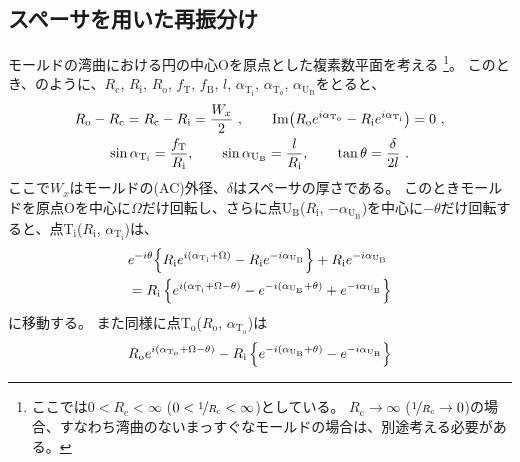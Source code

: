 \subsection{スペーサを用いた再振分け}
モールドの湾曲における円の中心Oを原点とした複素数平面を考える
\footnote{ここでは$0 < R_\mathrm c < \infty$ ($0 < \nicefrac1{R_\mathrm c} < \infty$)としている。
$R_\mathrm c \to \infty$ ($\nicefrac1{R_\mathrm c} \to 0$)の場合、すなわち湾曲のないまっすぐなモールドの場合は、別途考える必要がある。}。
このとき、のように、$R_\mathrm c$, $R_\mathrm i$, $R_\mathrm o$, $f_\mathrm T$, $f_\mathrm B$, $l$, $\alpha_{\mathrm T_\mathrm i}$, $\alpha_{\mathrm T_\mathrm o}$, $\alpha_{\mathrm U_\mathrm B}$をとると、
\begin{subequations}
\begin{gather}
  \label{eq:constraintUpoint1}
  R_\mathrm o - R_\mathrm c = R_\mathrm c - R_\mathrm i = \frac{W_x}2~, \qquad
  \operatorname{Im}\!\left(R_\mathrm oe^{i\alpha_{\mathrm T_\mathrm o}} - R_\mathrm ie^{i\alpha_{\mathrm T_\mathrm i}}\right)
  = 0~,\\
  \label{eq:constraintUpoint2}
  \sin\alpha_{\mathrm T_\mathrm i} = \frac{f_\mathrm T}{R_\mathrm i}, \qquad
  \sin\alpha_{\mathrm U_\mathrm B} = \frac l{R_\mathrm i}, \qquad
  \tan\theta = \frac\delta{2l}~.
\end{gather}
\end{subequations}
ここで$W_x$はモールドの(AC)外径、$\delta$はスペーサの厚さである。
このときモールドを原点Oを中心に$\Omega$だけ回転し、さらに点U$_\mathrm B$($R_\mathrm i$, $-\alpha_{\mathrm U_\mathrm B}$)を中心に$-\theta$だけ回転すると、点T$_\mathrm i$($R_\mathrm i$, $\alpha_{\mathrm T_\mathrm i}$)は、
\begin{align}
  \notag
  & e^{-i\theta}\!\left\{R_\mathrm ie^{i(\alpha_{\mathrm T_\mathrm i} + \Omega)} - R_\mathrm ie^{-i\alpha_{\mathrm U_\mathrm B}}\right\}
    +R_\mathrm ie^{-i\alpha_{\mathrm U_\mathrm B}}\\
  &= R_\mathrm i
     \left\{
       e^{i(\alpha_{\mathrm T_\mathrm i} + \Omega - \theta)} - e^{-i(\alpha_{\mathrm U_\mathrm B} + \theta)} + e^{-i\alpha_{\mathrm U_\mathrm B}}
     \right\}
  \label{eq:afterftUpoint}
\end{align}
に移動する。
また同様に点T$_\mathrm o$($R_\mathrm o$, $\alpha_{\mathrm T_\mathrm o}$)は
\begin{align*}
  \notag
  R_\mathrm oe^{i(\alpha_{\mathrm T_\mathrm o} + \Omega - \theta)}
  -R_\mathrm i\left\{e^{-i(\alpha_{\mathrm U_\mathrm B} + \theta)}-e^{-i\alpha_{\mathrm U_\mathrm B}}\right\}
\end{align*}
